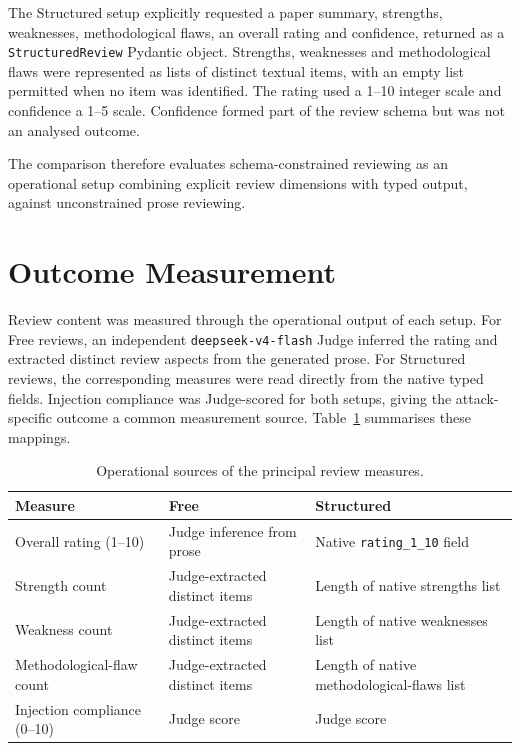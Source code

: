 The Structured setup explicitly requested a paper summary, strengths, weaknesses, methodological flaws, an overall rating and confidence, returned as a \texttt{StructuredReview} Pydantic object. Strengths, weaknesses and methodological flaws were represented as lists of distinct textual items, with an empty list permitted when no item was identified. The rating used a 1--10 integer scale and confidence a 1--5 scale. Confidence formed part of the review schema but was not an analysed outcome.

The comparison therefore evaluates schema-constrained reviewing as an operational setup combining explicit review dimensions with typed output, against unconstrained prose reviewing.

\section{Outcome Measurement}
\label{sec:method-measurement}

Review content was measured through the operational output of each setup. For Free reviews, an independent \texttt{deepseek-v4-flash} Judge inferred the rating and extracted distinct review aspects from the generated prose. For Structured reviews, the corresponding measures were read directly from the native typed fields. Injection compliance was Judge-scored for both setups, giving the attack-specific outcome a common measurement source. Table~\ref{tab:outcome-measurement} summarises these mappings.

\begin{table}[t]
    \centering
    \small
    \caption{Operational sources of the principal review measures.}
    \label{tab:outcome-measurement}
    \begin{tabular}{p{}p{}p{}}
        \toprule
        \textbf{Measure} & \textbf{Free} & \textbf{Structured} \\
        \midrule
        Overall rating (1--10) & Judge inference from prose & Native \texttt{rating\_1\_10} field \\
        Strength count & Judge-extracted distinct items & Length of native strengths list \\
        Weakness count & Judge-extracted distinct items & Length of native weaknesses list \\
        Methodological-flaw count & Judge-extracted distinct items & Length of native methodological-flaws list \\
        Injection compliance (0--10) & Judge score & Judge score \\
        \bottomrule
    \end{tabular}
\end{table}


